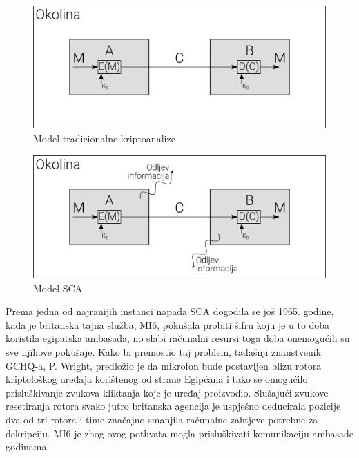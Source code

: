 \documentclass[times, utf8, diplomski]{fer}
\begin{document}
\begin{figure}[htb]
    \centering
    \includegraphics[width=12cm]{resources/images/SCA/traditional_model.png}
    \caption{Model tradicionalne kriptoanalize}
    \label{fig:traditional_model}
\end{figure}

\begin{figure}[htb]
    \centering
    \includegraphics[width=12cm]{resources/images/SCA/SCA_model.png}
    \caption{Model SCA}
    \label{fig:SCA_model}
\end{figure}

Prema \cite{zhou2005side} jedna od najranijih instanci napada SCA dogodila se još 1965. godine, kada je britanska tajna služba, MI6, pokušala probiti šifru koju je u to doba koristila egipatska ambasada, no slabi računalni resursi toga doba onemogućili su sve njihove pokušaje. Kako bi premostio taj problem, tadašnji znanstvenik GCHQ-a, P. Wright, predložio je da mikrofon bude postavljen blizu rotora kriptološkog uređaja korištenog od strane Egipćana i tako se omogućilo prisluškivanje zvukova kliktanja koje je uređaj proizvodio. Slušajući zvukove resetiranja rotora svako jutro britanska agencija je uspješno deducirala pozicije dva od tri rotora i time značajno smanjila računalne zahtjeve potrebne za dekripciju. MI6 je zbog ovog pothvata mogla prisluškivati komunikaciju ambasade godinama.
\end{document}
